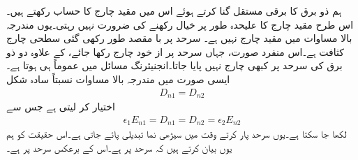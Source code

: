 ہم ذو برق کا برقی مستقل   گنا کرتے ہوئے اس میں مقید چارج کا حساب رکھتے ہیں۔ اس طرح مقید چارج  کا علیحدہ طور پر  خیال رکھنے کی ضرورت نہیں رہتی۔یوں مندرجہ بالا مساوات میں  مقید چارج نہیں ہے۔  سرحد پر با مقصد طور   رکھی گئی سطحی چارج کثافت ہے۔اس منفرد  صورت، جہاں سرحد پر از خود چارج رکھا جائے،  کے علاوہ دو ذو برق کی سرحد پر کبھی چارج نہیں پایا جاتا۔انجنیئرنگ مسائل میں عموماً  ہی ہوتا ہے۔ایسی صورت میں مندرجہ بالا مساوات نسبتاً سادہ شکل 
\begin{align}\label{مساوات_کپیسٹر_عمودی_برقی_بہاو_مسلسل_ہے}
D_{n1} =D_{n2}
\end{align}
اختیار کر لیتی ہے جس سے
\begin{align}
\epsilon_{1} E_{n1}= D_{n1}=D_{n2}=\epsilon_2 E_{n2}
\end{align}
لکھا جا سکتا ہے۔یوں سرحد پار کرتے وقت  میں سیڑھی نما تبدیلی پائے جاتی ہے۔اس حقیقت کو ہم یوں بیان کرتے ہیں کہ سرحد پر   ہے۔اس کے برعکس  سرحد پر  ہے۔

